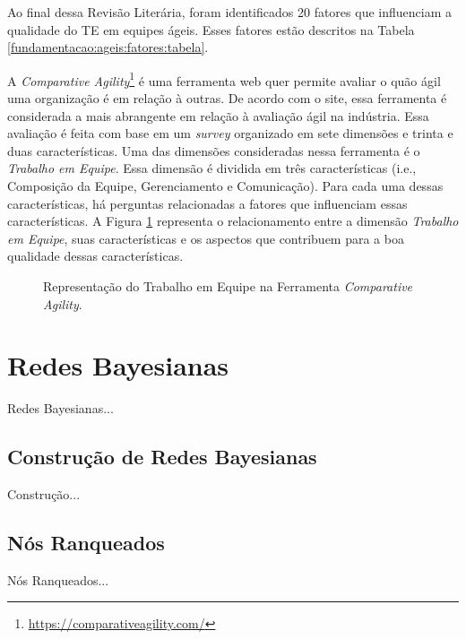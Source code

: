 Ao final dessa Revisão Literária, foram identificados 20 fatores que influenciam a qualidade do TE em equipes ágeis. Esses fatores estão descritos na Tabela \ref{fundamentacao:ageis:fatores:tabela}.


A \textit{Comparative Agility}\footnote{\url{https://comparativeagility.com/}} é uma ferramenta web quer permite avaliar o quão ágil uma organização é em relação à outras. De acordo com o site, essa ferramenta é considerada a mais abrangente em relação à avaliação ágil na indústria. Essa avaliação é feita com base em um \textit{survey} organizado em sete dimensões e trinta e duas características. Uma das dimensões consideradas nessa ferramenta é o \textit{Trabalho em Equipe}. Essa dimensão é dividida em três características (i.e., Composição da Equipe, Gerenciamento e Comunicação). Para cada uma dessas características, há perguntas relacionadas a fatores que influenciam essas características. A Figura \ref{fundamentacao:ageis:fatores:comparativeagility} representa o relacionamento entre a dimensão \textit{Trabalho em Equipe}, suas características e os aspectos que contribuem para a boa qualidade dessas características.

\begin{figure}[ht!]
\begin{center}
    \end{center}
    \caption{Representação do Trabalho em Equipe na Ferramenta \textit{Comparative Agility}.}
    \label{fundamentacao:ageis:fatores:comparativeagility}
\end{figure}

\section{Redes Bayesianas}
\label{fundamentacao:redes}

{\color{red} Redes Bayesianas...}

\subsection{Construção de Redes Bayesianas}
\label{fundamentacao:redes:construcao}

{\color{red} Construção...}

\subsection{Nós Ranqueados}
\label{fundamentacao:nos}

{\color{red} Nós Ranqueados...}
